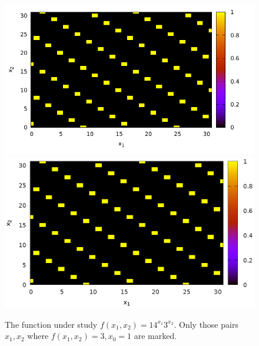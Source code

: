 \begin{figure}
\centering
\ifpdf
\includegraphics[angle=0]
{./part4/quantcomp/picdiscretlog1.pdf}
\else
\includegraphics[angle=0]
{./part4/quantcomp/picdiscretlog1.eps}
\fi

%

\caption{The function under study $f(x_1, x_2) = 14^{x_1}3^{x_2}$. Only those pairs $x_1, x_2$ where $f(x_1, x_2) = 3, x_0 = 1$ are marked.} 
\label{fig:part4:quantcomp:dl1}
\end{figure}